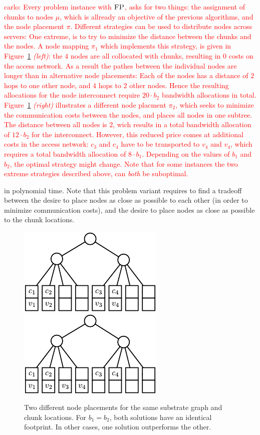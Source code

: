 \documentclass[9pt]{sigcomm-alternate}
\newcommand{\carlo}[1]{\textcolor{red}{carlo: #1}}
\newcommand{\VmChunkAssignment}{\mu}
\newcommand{\NodeMapping}{\pi}
\newcommand{\FP}{\textsc{FP}}
\newcommand{\CostTrans}{\ensuremath{b_1}}
\newcommand{\CostCom}{\ensuremath{b_2}}
\begin{document}
\carlo{Every problem instance with $\FP$, asks for two things: the 
assignment of chunks to nodes $\VmChunkAssignment$, which is allready an 
objective of the previous algorithms, and the node placement $\NodeMapping$. 
Different strategies can be used to distribute nodes across servers: One 
extreme, is to try to minimize the distance between the chunks and the nodes. A 
node mapping $\NodeMapping_1$ which implements this strategy, is given in 
Figure~\ref{fig:dynamic_motivation} \emph{(left)}: the $4$ nodes are all 
collocated with chunks, resulting in $0$ costs on the access network. As a 
result the pathes between the individual nodes are longer than in alternative 
node placements: Each of the nodes has a distance of $2$ hops to one other node, 
and $4$ hops to $2$ other nodes. Hence the resulting allocations for the 
node interconnect require $20 \cdot \CostCom$ bandwidth allocations in total. 
Figure~\ref{fig:dynamic_motivation} \emph{(right)} illustrates a different node 
placment $\NodeMapping_2$, which seeks to minimize the communication costs 
between the nodes, and places all nodes in one subtree. The distance between all 
nodes is $2$, wich results in a total bandwidth allocation of $12\cdot\CostCom$ 
for the interconnect. However, this reduced price comes at additional costs in 
the access network: $c_3$ and $c_4$ have to be transported to $v_4$ and $v_4$, 
which requires a total bandwidth allocation of $8 \cdot \CostTrans$. Depending 
on the values of $\CostTrans$ and $\CostCom$, the optimal strategy might 
change. Note that for some instances the two extreme strategies described 
above, can \emph{both} be suboptimal.}


in polynomial time. Note that this problem variant requires to find a 
tradeoff between the desire to place nodes as close as possible to each other
(in order to minimize communication costs), and the desire to place nodes 
as close as possible to
the chunk locations. 

\begin{figure}
\includegraphics[width = 0.49\columnwidth]{figs/dynamic_bad}
\hfill
\includegraphics[width = 0.49\columnwidth]{figs/dynamic_good}
\caption{Two different node placements for the same substrate graph and chunk
locations. For $\CostTrans = \CostCom$, both solutions have an identical
footprint. In other cases, one solution outperforms the other.}
\label{fig:dynamic_motivation}
\end{figure}
\end{document}
